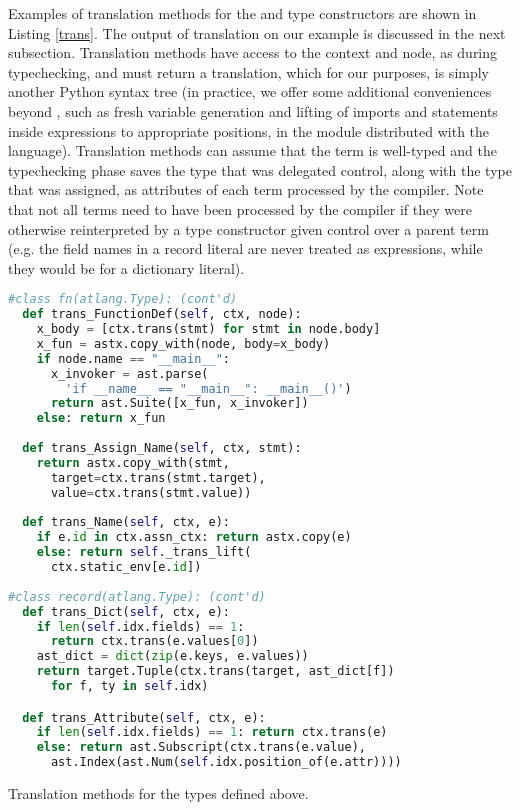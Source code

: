 Examples of translation methods for the  and  type constructors are shown in Listing \ref{trans}. The output of translation on our example is discussed in the next subsection. Translation methods have access to the context and node, as during typechecking, and must return a translation, which for our purposes, is simply another Python syntax tree (in practice, we offer some additional conveniences beyond , such as fresh variable generation and lifting of imports and statements inside expressions to appropriate positions, in the module  distributed with the language). Translation methods can assume that the term is well-typed and the typechecking phase saves the type that was delegated control, along with the type that was assigned, as attributes of each term processed by the compiler. Note that not all terms need to have been processed by the compiler if they were otherwise reinterpreted by a type constructor given control over a parent term (e.g. the field names in a record literal are never treated as expressions, while they would be for a dictionary literal). %
\begin{codelisting}[t]
\begin{lstlisting}[language=Python]
#class fn(atlang.Type): (cont'd)
  def trans_FunctionDef(self, ctx, node):
    x_body = [ctx.trans(stmt) for stmt in node.body]
    x_fun = astx.copy_with(node, body=x_body)
    if node.name == "__main__": 
      x_invoker = ast.parse(
        'if __name__ == "__main__": __main__()')
      return ast.Suite([x_fun, x_invoker])
    else: return x_fun
  
  def trans_Assign_Name(self, ctx, stmt):
    return astx.copy_with(stmt, 
      target=ctx.trans(stmt.target), 
      value=ctx.trans(stmt.value))
    
  def trans_Name(self, ctx, e):
    if e.id in ctx.assn_ctx: return astx.copy(e)
    else: return self._trans_lift(
      ctx.static_env[e.id])
    
#class record(atlang.Type): (cont'd)
  def trans_Dict(self, ctx, e): 
    if len(self.idx.fields) == 1: 
      return ctx.trans(e.values[0])
    ast_dict = dict(zip(e.keys, e.values))
    return target.Tuple(ctx.trans(target, ast_dict[f])
      for f, ty in self.idx)

  def trans_Attribute(self, ctx, e):
    if len(self.idx.fields) == 1: return ctx.trans(e)
    else: return ast.Subscript(ctx.trans(e.value), 
      ast.Index(ast.Num(self.idx.position_of(e.attr))))
\end{lstlisting}
\caption{Translation methods for the types defined above.}
\label{trans}
\end{codelisting}

